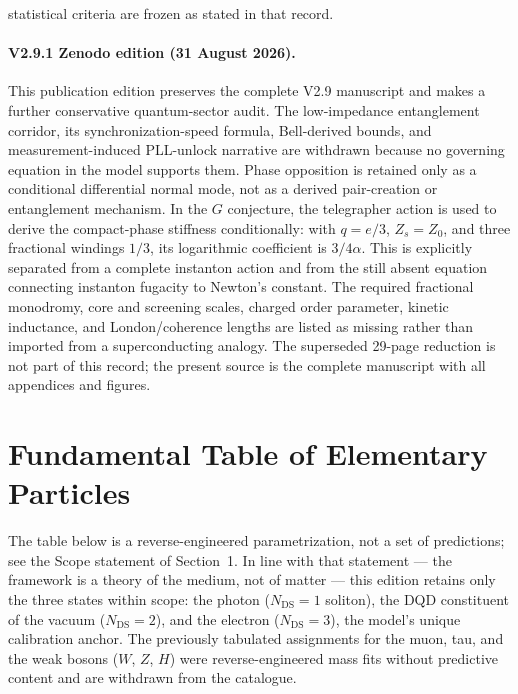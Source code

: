 \documentclass[11pt,a4paper]{article}
\theoremstyle{plain}
\theoremstyle{remark}
\newcommand{\Ncd}{\ensuremath{N_{\mathrm{DS}}}}
\begin{document}
statistical criteria are frozen as stated in that record.

\paragraph{V2.9.1 Zenodo edition (31 August 2026).} This publication edition preserves the complete V2.9 manuscript and makes a further conservative quantum-sector audit. The low-impedance entanglement corridor, its synchronization-speed formula, Bell-derived bounds, and measurement-induced PLL-unlock narrative are withdrawn because no governing equation in the model supports them. Phase opposition is retained only as a conditional differential normal mode, not as a derived pair-creation or entanglement mechanism. In the $G$ conjecture, the telegrapher action is used to derive the compact-phase stiffness conditionally: with $q=e/3$, $Z_s=Z_0$, and three fractional windings $1/3$, its logarithmic coefficient is $3/4\alpha$. This is explicitly separated from a complete instanton action and from the still absent equation connecting instanton fugacity to Newton's constant. The required fractional monodromy, core and screening scales, charged order parameter, kinetic inductance, and London/coherence lengths are listed as missing rather than imported from a superconducting analogy. The superseded 29-page reduction is not part of this record; the present source is the complete manuscript with all appendices and figures.

\section{Fundamental Table of Elementary Particles}
The table below is a reverse-engineered parametrization, not a set of predictions; see the Scope statement of Section~1. In line with that statement --- the framework is a theory of the medium, not of matter --- this edition retains only the three states within scope: the photon ($\Ncd=1$ soliton), the DQD constituent of the vacuum ($\Ncd=2$), and the electron ($\Ncd=3$), the model's unique calibration anchor. The previously tabulated assignments for the muon, tau, and the weak bosons ($W$, $Z$, $H$) were reverse-engineered mass fits without predictive content and are withdrawn from the catalogue.
\end{document}
